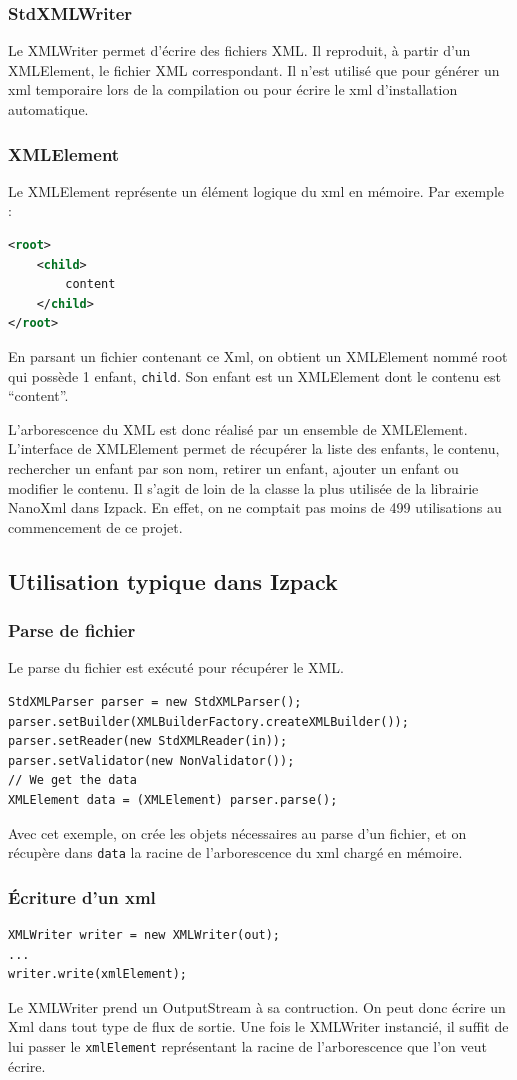 \subsubsection{StdXMLWriter}
Le XMLWriter permet d'écrire des fichiers XML.
Il reproduit, à partir d'un XMLElement, le fichier XML correspondant.
Il n'est utilisé que pour générer un xml temporaire lors de la compilation ou pour écrire le xml d'installation automatique.
\subsubsection{XMLElement}
Le XMLElement représente un élément logique du xml en mémoire. Par exemple :
\begin{lstlisting}[language=xml]
<root>
	<child>
		content
	</child>
</root>
\end{lstlisting}
En parsant un fichier contenant ce Xml, on obtient un XMLElement nommé root qui possède 1 enfant, \verb|child|. Son enfant est un XMLElement dont le contenu est ``content''.

L'arborescence du XML est donc réalisé par un ensemble de XMLElement.
L'interface de XMLElement permet de récupérer la liste des enfants, le contenu, rechercher un enfant par son nom, retirer un enfant, ajouter un enfant ou modifier le contenu.
Il s'agit de loin de la classe la plus utilisée de la librairie NanoXml dans Izpack.
En effet, on ne comptait pas moins de 499 utilisations au commencement de ce projet.
\subsection{Utilisation typique dans Izpack}
\subsubsection{Parse de fichier}
Le parse du fichier est exécuté pour récupérer le XML.
\begin{lstlisting}
StdXMLParser parser = new StdXMLParser();
parser.setBuilder(XMLBuilderFactory.createXMLBuilder());
parser.setReader(new StdXMLReader(in));
parser.setValidator(new NonValidator());
// We get the data
XMLElement data = (XMLElement) parser.parse();
\end{lstlisting}
Avec cet exemple, on crée les objets nécessaires au parse d'un fichier, et on récupère dans \verb|data| la racine de l'arborescence du xml chargé en mémoire.
\subsubsection{Écriture d'un xml}
\begin{lstlisting}
XMLWriter writer = new XMLWriter(out);
...
writer.write(xmlElement);
\end{lstlisting}
Le XMLWriter prend un OutputStream à sa contruction.
On peut donc écrire un Xml dans tout type de flux de sortie. 
Une fois le XMLWriter instancié, il suffit de lui passer le \verb|xmlElement| représentant la racine de l'arborescence que l'on veut écrire.
